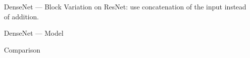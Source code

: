 \begin{frame}{DenseNet --- Block}
  Variation on ResNet: use concatenation of the input instead of addition.

\end{frame}

\begin{frame}{DenseNet --- Model}
\end{frame}

\begin{frame}{Comparison}
\end{frame}
